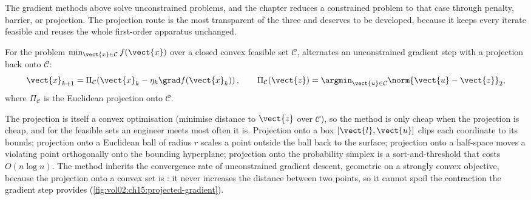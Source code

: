 The gradient methods above solve unconstrained problems, and the
chapter reduces a constrained problem to that case through penalty,
barrier, or projection. The projection route is the most transparent
of the three and deserves to be developed, because it keeps every
iterate feasible and reuses the whole first-order apparatus unchanged.

\begin{definition}
For the problem $\min_{\vect{x} \in \mathcal{C}} f(\vect{x})$ over a
closed convex feasible set $\mathcal{C}$,  alternates an unconstrained gradient step with a projection
back onto $\mathcal{C}$:
\[
\vect{x}_{k+1} = \Pi_{\mathcal{C}}\!\left(\vect{x}_{k} - \eta_{k}
\grad f(\vect{x}_{k})\right),
\qquad
\Pi_{\mathcal{C}}(\vect{z}) = \argmin_{\vect{u} \in \mathcal{C}}
\norm{\vect{u} - \vect{z}}_{2},
\]
where $\Pi_{\mathcal{C}}$ is the Euclidean projection onto
$\mathcal{C}$.
\end{definition}

The projection is itself a convex optimisation (minimise distance to
$\vect{z}$ over $\mathcal{C}$), so the method is only cheap when the
projection is cheap, and for the feasible sets an engineer meets most
often it is. Projection onto a box $[\vect{l}, \vect{u}]$ clips each
coordinate to its bounds; projection onto a Euclidean ball of radius
$r$ scales a point outside the ball back to the surface; projection
onto a half-space moves a violating point orthogonally onto the
bounding hyperplane; projection onto the probability simplex is a
sort-and-threshold that costs $O(n \log n)$. The method inherits the
convergence rate of unconstrained gradient descent, geometric on a
strongly convex objective, because the projection onto a convex set is
: it never increases the distance between two
points, so it cannot spoil the contraction the gradient step provides
(\cref{fig:vol02:ch15:projected-gradient}).



